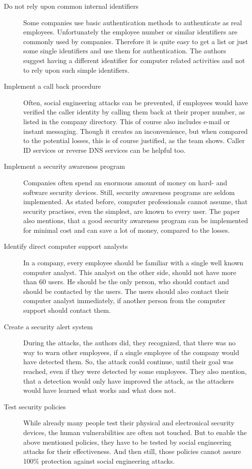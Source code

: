 \begin{description}
  \item[Do not rely upon common internal identifiers] Some companies use basic
  authentication methods to authenticate as real employees. Unfortunately the
  employee number or similar identifiers are commonly used by companies.
  Therefore it is quite easy to get a list or just some single identifiers and
  use them for authentication. The authors suggest having a different
  identifier for computer related activities and not to rely upon such simple
  identifiers.
  \item[Implement a call back procedure] Often, social engineering attacks can
  be prevented, if employees would have verified the caller identity by calling
  them back at their proper number, as listed in the company directory. This of
  course also includes e-mail or instant messaging. Though it creates an
  inconvenience, but when compared to the potential losses, this is of course
  justified, as the team shows. Caller ID services or reverse DNS services can
  be helpful too.
  \item[Implement a security awareness program] Companies often spend an
  enormous amount of money on hard- and software security devices. Still, security
  awareness programs are seldom implemented. As stated before, computer
  professionals cannot assume, that security practises, even the simplest, are
  known to every user. The paper also mentions, that a good security awareness
  program can be implemented for minimal cost and can save a lot of money,
  compared to the losses.
  \item[Identify direct computer support analysts] In a company, every employee
  should be familiar with a single well known computer analyst. This analyst on
  the other side, should not have more than 60 users. He should be the only
  person, who should contact and should be contacted by the users. The users
  should also contact their computer analyst immediately, if another person
  from the computer support should contact them.
  \item[Create a security alert system] During the attacks, the authors did,
  they recognized, that there was no way to warn other employees, if a single
  employee of the company would have detected them. So, the attack could
  continue, until their goal was reached, even if they were detected by some
  employees. They also mention, that a detection would only have improved the
  attack, as the attackers would have learned what works and what does
  not.
  \item[Test security policies] While already many people test their physical
  and electronical security devices, the human vulnerabilities are often not
  touched. But to enable the above mentioned policies, they have to be tested
  by social engineering attacks for their effectiveness. And then still, those
  policies cannot assure 100\% protection against social engineering attacks.
\end{description}

